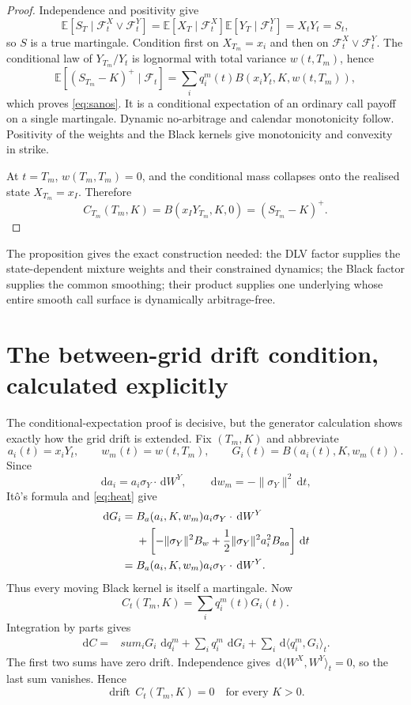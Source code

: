 \documentclass[11pt,a4paper]{article}
\newcommand{\E}{\mathbb E}
\newcommand{\F}{\mathcal F}
\newcommand{\dd}{\,\mathrm d}
\begin{document}
\begin{proof}
Independence and positivity give
\[
 \E[S_T\mid\F_t^X\vee\F_t^Y]
 =\E[X_T\mid\F_t^X]\E[Y_T\mid\F_t^Y]=X_tY_t=S_t,
\]
so $S$ is a true martingale.  Condition first on $X_{T_m}=x_i$ and then on
$\F_t^X\vee\F_t^Y$.  The conditional law of $Y_{T_m}/Y_t$ is lognormal with
total variance $w(t,T_m)$, hence
\[
 \E[(S_{T_m}-K)^+\mid\F_t]
 =\sum_iq_i^m(t)B(x_iY_t,K,w(t,T_m)),
\]
which proves \eqref{eq:sanos}.  It is a conditional expectation of an
ordinary call payoff on a single martingale.  Dynamic no-arbitrage and
calendar monotonicity follow.  Positivity of the weights and the Black kernels
give monotonicity and convexity in strike.

At $t=T_m$, $w(T_m,T_m)=0$, and the conditional mass collapses onto the
realised state $X_{T_m}=x_I$.  Therefore
\[
 C_{T_m}(T_m,K)=B(x_IY_{T_m},K,0)
 =(S_{T_m}-K)^+.
\]
\end{proof}

The proposition gives the exact construction needed: the DLV factor supplies
the state-dependent mixture weights and their constrained dynamics; the Black
factor supplies the common smoothing; their product supplies one underlying
whose entire smooth call surface is dynamically arbitrage-free.

\section{The between-grid drift condition, calculated explicitly}

The conditional-expectation proof is decisive, but the generator calculation
shows exactly how the grid drift is extended.  Fix $(T_m,K)$ and abbreviate
\[
 a_i(t)=x_iY_t,\qquad w_m(t)=w(t,T_m),\qquad
 G_i(t)=B(a_i(t),K,w_m(t)).
\]
Since
\[
 \dd a_i=a_i\sigma_Y\cdot\dd W^Y,\qquad
 \dd w_m=-\lVert\sigma_Y\rVert^2\dd t,
\]
It\^o's formula and \eqref{eq:heat} give
\begin{align}
 \dd G_i={}&B_a(a_i,K,w_m)a_i\sigma_Y\cdot\dd W^Y\notag\\
 &+\left[-\lVert\sigma_Y\rVert^2B_w
 +\frac12\lVert\sigma_Y\rVert^2a_i^2B_{aa}\right]\dd t\notag\\
 ={}&B_a(a_i,K,w_m)a_i\sigma_Y\cdot\dd W^Y.
 \label{eq:kernelmart}
\end{align}
Thus every moving Black kernel is itself a martingale.  Now
\begin{equation}
 C_t(T_m,K)=\sum_iq_i^m(t)G_i(t).
\end{equation}
Integration by parts gives
\begin{align}
 \dd C={}&sum_iG_i\,\dd q_i^m
          +\sum_iq_i^m\,\dd G_i
          +\sum_i\dd\langle q_i^m,G_i\rangle_t.
 \label{eq:productito}
\end{align}
The first two sums have zero drift.  Independence gives
$\dd\langle W^X,W^Y\rangle_t=0$, so the last sum vanishes.  Hence
\begin{equation}
 \boxed{
 \operatorname{drift}\,C_t(T_m,K)=0
 \quad\text{for every }K>0.}
 \label{eq:offgridzero}
\end{equation}
\end{document}
